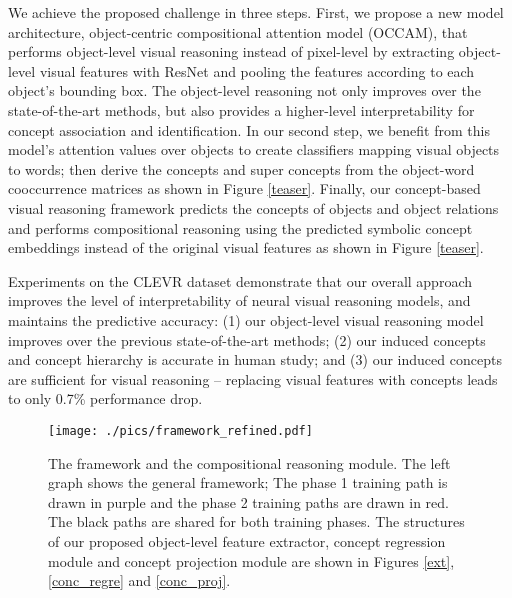 \documentclass[final]{cvpr}
\begin{document}
We achieve the proposed challenge in three steps.
First, we propose a new model architecture, object-centric compositional attention model (OCCAM), that performs object-level visual reasoning instead of pixel-level by extracting object-level visual features with ResNet \cite{He_2016_CVPR} and pooling the features according to each object's bounding box.
The object-level reasoning not only improves over the state-of-the-art methods, but also provides a higher-level interpretability for concept association and identification.
In our second step, we benefit from this model's attention values over objects to create classifiers mapping visual objects to words; then derive the concepts and super concepts from the object-word cooccurrence matrices as shown in Figure \ref{teaser}.
Finally, our concept-based visual reasoning framework predicts the concepts of objects and object relations and performs compositional reasoning using the predicted symbolic concept embeddings instead of the original visual features as shown in Figure \ref{teaser}.





Experiments on the CLEVR dataset demonstrate that our overall approach improves the level of interpretability of neural visual reasoning models, and maintains the predictive accuracy: (1) our object-level visual reasoning model improves over the previous state-of-the-art methods; (2) our induced concepts and concept hierarchy is accurate in human study; and (3) our induced concepts are sufficient for visual reasoning -- replacing visual features with concepts leads to only 0.7\% performance drop.


\begin{figure*}[t]
\centering
\texttt{[image: ./pics/framework\_refined.pdf]}
\caption{The framework and the compositional reasoning module. The left graph shows the general framework; The phase 1 training path is drawn in purple and the phase 2 training paths are drawn in red. The black paths are shared for both training phases. The structures of our proposed object-level feature extractor, concept regression module and concept projection module are shown in Figures \ref{ext}, \ref{conc_regre} and \ref{conc_proj}.}
\label{framework}
\vspace{-3mm}
\end{figure*}
\end{document}
